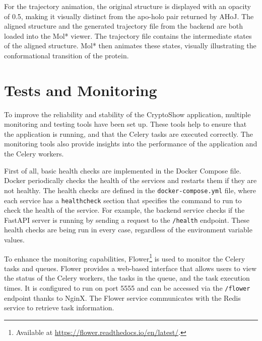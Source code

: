 For the trajectory animation, the original structure is displayed with an opacity of 0.5, making it visually distinct from the apo-holo pair returned by AHoJ. The aligned structure and the generated trajectory file from the backend are both loaded into the Mol* viewer. The trajectory file contains the intermediate states of the aligned structure. Mol* then animates these states, visually illustrating the conformational transition of the protein.


\section{Tests and Monitoring}
\label{sec:tests-monitoring}

To improve the reliability and stability of the CryptoShow application, multiple monitoring and testing tools have been set up. These tools help to ensure that the application is running, and that the Celery tasks are executed correctly. The monitoring tools also provide insights into the performance of the application and the Celery workers.

First of all, basic health checks are implemented in the Docker Compose file. Docker periodically checks the health of the services and restarts them if they are not healthy. The health checks are defined in the \lstinline!docker-compose.yml! file, where each service has a \lstinline|healthcheck| section that specifies the command to run to check the health of the service. For example, the backend service checks if the FastAPI server is running by sending a request to the \lstinline!/health! endpoint. These health checks are being run in every case, regardless of the environment variable values.

To enhance the monitoring capabilities, Flower\footnote{Available at \url{https://flower.readthedocs.io/en/latest/}.} is used to monitor the Celery tasks and queues. Flower provides a web-based interface that allows users to view the status of the Celery workers, the tasks in the queue, and the task execution times. It is configured to run on port 5555 and can be accessed via the \lstinline!/flower! endpoint thanks to NginX. The Flower service communicates with the Redis service to retrieve task information.

